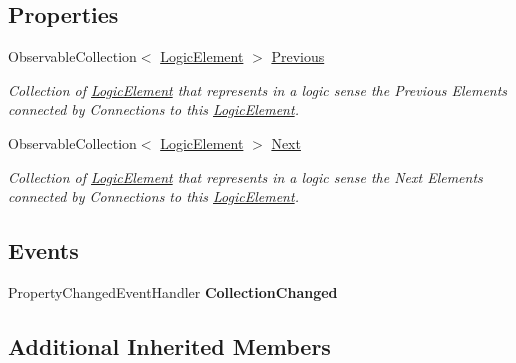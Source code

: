 \subsection*{Properties}
\begin{DoxyCompactItemize}
\item 
Observable\+Collection$<$ \hyperlink{class_prototipo_t_f_g_1_1_logic_element}{Logic\+Element} $>$ \hyperlink{class_prototipo_t_f_g_1_1_logic_element_a7f4726fd57b4d6ae46f81da0cbc491d0}{Previous}
\begin{DoxyCompactList}\small\item\em Collection of \hyperlink{class_prototipo_t_f_g_1_1_logic_element}{Logic\+Element} that represents in a logic sense the Previous Elements connected by Connections to this \hyperlink{class_prototipo_t_f_g_1_1_logic_element}{Logic\+Element}. \end{DoxyCompactList}\item 
Observable\+Collection$<$ \hyperlink{class_prototipo_t_f_g_1_1_logic_element}{Logic\+Element} $>$ \hyperlink{class_prototipo_t_f_g_1_1_logic_element_a98ba9135844355b76b2101433f73cd1c}{Next}
\begin{DoxyCompactList}\small\item\em Collection of \hyperlink{class_prototipo_t_f_g_1_1_logic_element}{Logic\+Element} that represents in a logic sense the Next Elements connected by Connections to this \hyperlink{class_prototipo_t_f_g_1_1_logic_element}{Logic\+Element}. \end{DoxyCompactList}\end{DoxyCompactItemize}
\subsection*{Events}
\begin{DoxyCompactItemize}
\item 
\hypertarget{class_prototipo_t_f_g_1_1_logic_element_a531c3e554f28410e987734dff2f08e78}{}Property\+Changed\+Event\+Handler {\bfseries Collection\+Changed}\label{class_prototipo_t_f_g_1_1_logic_element_a531c3e554f28410e987734dff2f08e78}

\end{DoxyCompactItemize}
\subsection*{Additional Inherited Members}


